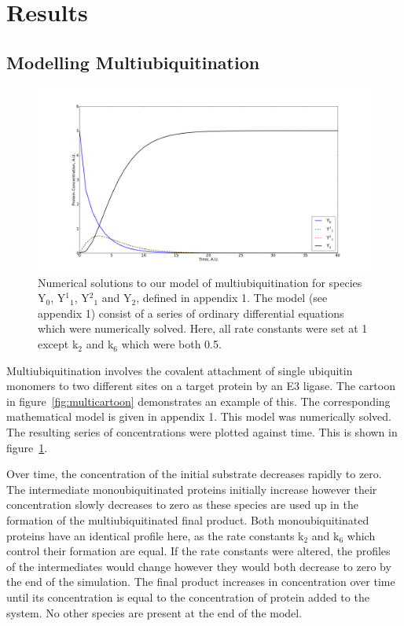 \documentclass[11pt]{article}
\begin{document}
\section{Results}

\subsection{Modelling Multiubiquitination}\label{multi}
\begin{figure}[H]
	\centering
	\includegraphics[width=1.0\textwidth]{./images/simple_multimodel.png}
	\caption{Numerical solutions to our model of multiubiquitination for species Y$_0$, Y$^1$$_1$, Y$^2$$_1$ and Y$_2$, defined in appendix 1. The model (see appendix 1) consist of a series of ordinary differential equations which were numerically solved. Here, all rate constants were set at 1 except k$_2$ and k$_6$ which were both 0.5.}
	\label{fig:multi model}
\end{figure}

Multiubiquitination involves the covalent attachment of single ubiquitin monomers to two different sites on a target protein by an E3 ligase. The cartoon in figure~\ref{fig:multicartoon} demonstrates an example of this. The corresponding mathematical model is given in appendix 1. This model was numerically solved. The resulting series of concentrations were plotted against time. This is shown in figure~\ref{fig:multi model}.

Over time, the concentration of the initial substrate decreases rapidly to zero. The intermediate monoubiquitinated proteins initially increase however their concentration slowly decreases to zero as these species are used up in the formation of the multiubiquitinated final product. Both monoubiquitinated proteins have an identical profile here, as the rate constants k$_2$ and k$_6$ which control their formation are equal. If the rate constants were altered, the profiles of the intermediates would change however they would both decrease to zero by the end of the simulation. The final product increases in concentration over time until its concentration is equal to the concentration of protein added to the system. No other species are present at the end of the model.
\end{document}

